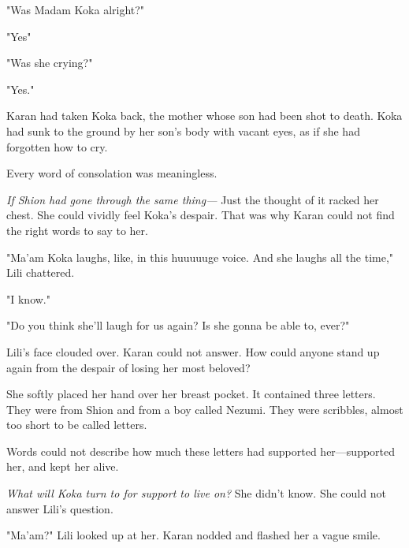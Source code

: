 "Was Madam Koka alright?"

"Yes\el "

"Was she crying?"

"Yes."

Karan had taken Koka back, the mother whose son had been shot to death.
Koka had sunk to the ground by her son's body with vacant eyes, as if
she had forgotten how to cry.

Every word of consolation was meaningless.

\emph{If Shion had gone through the same thing---} Just the thought of it racked
her chest. She could vividly feel Koka's despair. That was why Karan
could not find the right words to say to her.

"Ma'am Koka laughs, like, in this huuuuuge voice. And she laughs all the
time," Lili chattered.

"I know."

"Do you think she'll laugh for us again? Is she gonna be able to, ever?"

Lili's face clouded over. Karan could not answer. How could anyone stand
up again from the despair of losing her most beloved?

She softly placed her hand over her breast pocket. It contained three
letters. They were from Shion and from a boy called Nezumi. They were
scribbles, almost too short to be called letters.




Words could not describe how much these letters had supported
her---supported her, and kept her alive.

\emph{What will Koka turn to for support to live on?} She didn't know. She
could not answer Lili's question.

"Ma'am?" Lili looked up at her. Karan nodded and flashed her a vague
smile.

